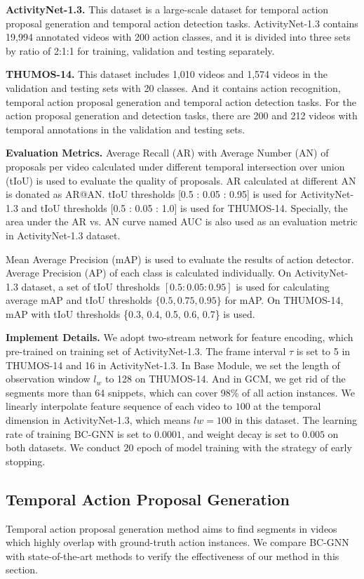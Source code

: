 \documentclass[runningheads]{llncs}
\begin{document}
\noindent\textbf{ActivityNet-1.3.}
This dataset is a large-scale dataset for temporal action proposal generation and temporal action detection tasks. ActivityNet-1.3 contains 19,994 annotated videos with 200 action classes, and it is divided into three sets by ratio of 2:1:1 for training, validation and testing separately.

\noindent\textbf{THUMOS-14.}
This dataset includes 1,010 videos and 1,574 videos in the validation and testing sets with 20 classes. And it contains action recognition, temporal action proposal generation and temporal action detection tasks. For the action proposal generation and detection tasks, there are 200 and 212 videos with temporal annotations in the validation and testing sets.

\noindent\textbf{Evaluation Metrics.}
Average Recall (AR) with Average Number (AN) of proposals per video calculated under different temporal intersection over union (tIoU) is used to evaluate the quality of proposals. AR calculated at different AN is donated as AR@AN. tIoU thresholds [0.5 : 0.05 : 0.95] is used for ActivityNet-1.3 and tIoU thresholds [0.5 : 0.05 : 1.0] is used for THUMOS-14. Specially, the area under the AR vs. AN curve named AUC is also used as an evaluation metric in ActivityNet-1.3 dataset.

Mean Average Precision (mAP) is used to evaluate the results of action detector. Average Precision (AP) of each class is calculated individually. On ActivityNet-1.3 dataset, a set of tIoU thresholds $[0.5: 0.05: 0.95]$ is used for calculating average mAP and tIoU thresholds $\{0.5,0.75,0.95\}$ for mAP. On THUMOS-14, mAP with tIoU thresholds  \{0.3, 0.4, 0.5, 0.6, 0.7\} is used.

\noindent\textbf{Implement Details.}
We adopt two-stream network \cite{two-stream} for feature encoding, which pre-trained on training set of ActivityNet-1.3. The frame interval $\tau$ is set to 5 in THUMOS-14 and 16 in ActivityNet-1.3.
In Base Module, we set the length of observation window  $l_w$ to 128 on THUMOS-14. And in GCM, we get rid of the segments more than 64 snippets, which can cover 98\% of all action instances.
We linearly interpolate feature sequence of each video to $100$ at the temporal dimension in ActivityNet-1.3, which means $lw = 100$ in this dataset. The learning rate of training BC-GNN is set to $0.0001$, and weight decay is set to $0.005$ on both datasets. We conduct $20$ epoch of model training with the strategy of early stopping.

\subsection{Temporal Action Proposal Generation}
Temporal action proposal generation method aims to find segments in videos which highly overlap with ground-truth action instances. We compare BC-GNN with state-of-the-art methods to verify the effectiveness of our method in this section.
\end{document}
